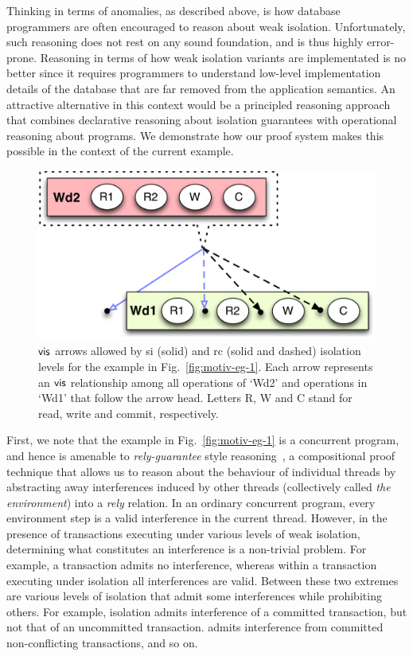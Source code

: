 Thinking in terms of anomalies, as described above, is how database
programmers are often encouraged to reason about weak isolation.
Unfortunately, such reasoning does not rest on any sound foundation,
and is thus highly error-prone. Reasoning in terms of how weak
isolation variants are implementated is no better since it requires
programmers to understand low-level implementation details of the
database that are far removed from the application semantics. An
attractive  alternative in this context would be a principled
reasoning approach that combines declarative reasoning about isolation
guarantees with operational reasoning about programs. We demonstrate
how our proof system makes this possible in the context of the current
example.

\begin{figure}
\centering
  \includegraphics[scale=0.4]{Figures/motiv-eg-1-hb}

\caption{$\textsf{vis}$ arrows allowed by {\sc si} (solid) and {\sc rc} (solid
  and dashed) isolation levels for the example in
  Fig.~\ref{fig:motiv-eg-1}. Each arrow represents an $\textsf{vis}$ relationship
  among all operations of `Wd2' and operations in `Wd1' that follow
  the arrow head. Letters R, W and C stand for read, write and commit,
  respectively.}
\label{fig:motiv-eg-1-hb}
\end{figure}

First, we note that the example in Fig.~\ref{fig:motiv-eg-1} is a
concurrent program, and hence is amenable to \emph{rely-guarantee}
style reasoning~\cite{rgjones}, a compositional proof technique that
allows us to reason about the behaviour of individual threads by
abstracting away interferences induced by other threads (collectively
called \emph{the environment}) into a \emph{rely} relation. In an
ordinary concurrent program, every environment step is a valid
interference in the current thread. However, in the presence of
transactions executing under various levels of weak isolation,
determining what constitutes an interference is a non-trivial problem.
For example, a  transaction admits no interference,
whereas within a transaction executing under 
isolation all interferences are valid. Between these two extremes are
various levels of isolation that admit some interferences while
prohibiting others. For example,  isolation admits
interference of a committed transaction, but not that of an
uncommitted transaction.  admits interference
from committed non-conflicting transactions, and so on.

